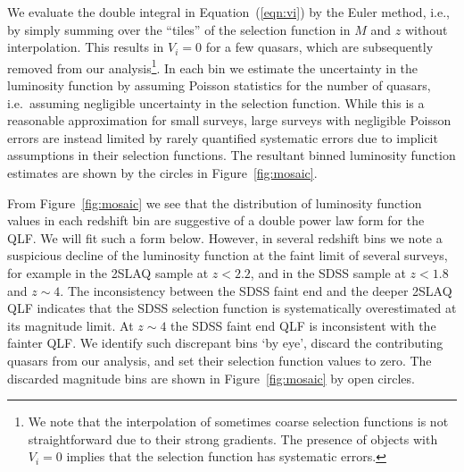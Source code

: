 \documentclass[fleqn,usenatbib]{mnras}
\begin{document}
We evaluate the double integral in Equation~(\ref{eqn:vi}) by the Euler method,
i.e., by simply summing over the ``tiles'' of the selection function in $M$ and $z$
without interpolation.
This results in $V_i=0$ for a few quasars, which are subsequently removed
from our analysis\footnote{
  We note that the interpolation of sometimes coarse
  selection functions is not straightforward due to their strong gradients.
  The presence of objects with $V_i=0$ implies that the selection function has systematic errors.}.
In each bin we estimate the uncertainty in the luminosity function by
assuming Poisson statistics \citep{1986ApJ...303..336G} for the number
of quasars, i.e.\ assuming negligible uncertainty in the selection function.
While this is a reasonable approximation for small surveys, large surveys
with negligible Poisson errors are instead limited by rarely quantified systematic
errors due to implicit assumptions in their selection functions.
The resultant binned luminosity function estimates
are shown by the circles in Figure~\ref{fig:mosaic}.

From Figure~\ref{fig:mosaic} we see that the distribution of luminosity
function values in each redshift bin are suggestive of a double power
law form for the QLF.  We will fit such a form below. 
However, in several redshift bins we note a suspicious decline of the
luminosity function at the faint limit of several surveys, for example in
the 2SLAQ sample at $z<2.2$, and in the SDSS sample at $z<1.8$ and $z\sim 4$.
The inconsistency between the SDSS faint end and the deeper
2SLAQ QLF indicates that the SDSS selection function is
systematically overestimated at its magnitude limit.
At $z\sim 4$ the SDSS faint end QLF is inconsistent with the fainter
\citet{2011ApJ...728L..26G} QLF. We identify such discrepant bins
`by eye', discard the contributing quasars from our analysis, and set their
selection function values to zero.
The discarded magnitude bins are shown in Figure~\ref{fig:mosaic} by
open circles.
\end{document}
